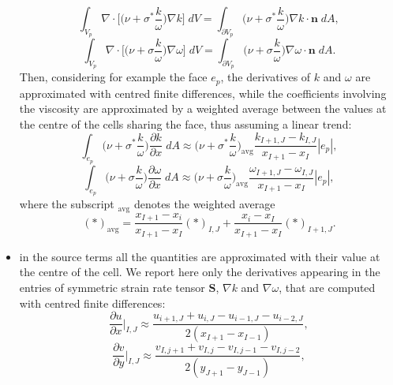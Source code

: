\begin{itemize}
\begin{equation}
	\int_{V_p} \nabla \cdot \bigg[\bigg(\nu + 
	\sigma^*\frac{k}{\omega}\bigg) \nabla k\bigg] \; dV = \int_{\partial 
		V_p} \bigg(\nu + \sigma^*\frac{k}{\omega}\bigg) \nabla k \cdot 
	\mathbf{n} \; dA,
	\end{equation}
	\begin{equation}
	\int_{V_p} \nabla \cdot \bigg[\bigg(\nu + \sigma\frac{k}{\omega}\bigg) 
	\nabla \omega\bigg] \; dV = \int_{\partial V_p} \bigg(\nu + \sigma 
	\frac{k}{\omega}\bigg) \nabla \omega \cdot \mathbf{n} \; dA.
	\end{equation}
	Then, considering for example the face $e_p$, the derivatives of $k$ and 
	$\omega$ are approximated with centred finite differences, while the 
	coefficients involving the viscosity are approximated by a weighted average 
	between the values at the centre of the cells sharing the face, thus 
	assuming a linear trend:
	\begin{equation}
	\int_{e_p} \bigg(\nu + \sigma^*\frac{k}{\omega}\bigg) \frac{\partial 
		k}{\partial x} \; dA \approx \bigg(\nu + \sigma^* 
	\frac{k}{\omega}\bigg)_\text{avg} \frac{k_{I+1,J}-k_{I,J}}{x_{I+1}-x_I} 
	|e_p|,
	\end{equation}
	\begin{equation}
	\int_{e_p} \bigg(\nu + \sigma\frac{k}{\omega}\bigg) \frac{\partial 
		\omega}{\partial x} \; dA \approx \bigg(\nu + \sigma 
	\frac{k}{\omega}\bigg)_\text{avg} 
	\frac{\omega_{I+1,J}-\omega_{I,J}}{x_{I+1} - x_I} |e_p|,
	\end{equation}
	where the subscript $_\text{avg}$ denotes the weighted average
	\begin{equation}
	(\ast)_\text{avg} = \frac{x_{I+1} - x_i}{x_{I+1} - x_I}(\ast)_{I,J} + 
	\frac{x_i-x_I}{x_{I+1} - x_I}(\ast)_{I+1,J}.
	\end{equation}
	\item in the source terms all the quantities are approximated with their 
	value at the centre of the cell. We report here only the derivatives 
	appearing in the entries of symmetric strain rate tensor $\mathbf{S}$,
	$\nabla k$ and $\nabla \omega$, that are computed with centred finite
	differences:
	\begin{equation}
	\frac{\partial u}{\partial x}\Big|_{I,J} \approx 
	\frac{u_{i+1,J}+u_{i,J}-u_{i-1,J}-u_{i-2,J}}{2(x_{I+1}-x_{I-1})},
	\end{equation}
	\begin{equation}
	\frac{\partial v}{\partial y} \Big|_{I,J} \approx
	\frac{v_{I,j+1}+v_{I,j}-v_{I,j-1}-v_{I,j-2}}{2(y_{J+1}-y_{J-1})},
	\end{equation}

\end{itemize}
